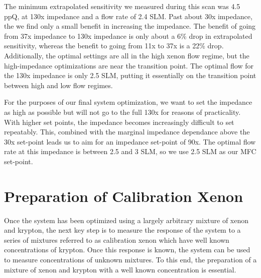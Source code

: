 \documentclass[12pt]{article}
\begin{document}
The minimum extrapolated sensitivity we measured during this scan was 4.5 ppQ, at 130x impedance and a flow rate of 2.4 SLM. Past about 30x impedance, the we find only a small benefit in increasing the impedance. The benefit of going from 37x impedance to 130x impedance is only about a 6\% drop in extrapolated sensitivity, whereas the benefit to going from 11x to 37x is a 22\% drop. Additionally, the optimal settings are all in the high xenon flow regime, but the high-impedance optimizations are near the transition point. The optimal flow for the 130x impedance is only 2.5 SLM, putting it essentially on the transition point between high and low flow regimes.

For the purposes of our final system optimization, we want to set the impedance as high as possible but will not go to the full 130x for reasons of practicality. With higher set points, the impedance becomes increasingly difficult to set repeatably. This, combined with the marginal impedance dependance above the 30x  set-point leads us to aim for an impedance set-point of 90x. The optimal flow rate at this impedance is between 2.5 and 3 SLM, so we use 2.5 SLM as our MFC set-point.



\section{Preparation of Calibration Xenon}
\label{sec:calprep}
Once the system has been optimized using a largely arbitrary mixture of xenon and krypton, the next key step is to measure the response of the system to a series of mixtures referred to as calibration xenon which have well known concentrations of krypton. Once this response is known, the system can be used to measure concentrations of unknown mixtures. To this end, the preparation of a mixture of xenon and krypton with a well known concentration is essential.
\end{document}
